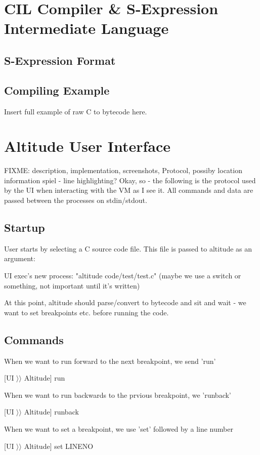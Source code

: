 \documentclass[10pt,a4paper]{report}
\begin{document}
\section{CIL Compiler \& S-Expression Intermediate Language}
\subsection{S-Expression Format}

\subsection{Compiling Example}
Insert full example of raw C to bytecode here.
\section{Altitude User Interface}
FIXME: description, implementation, screenshots, Protocol, possiby location information spiel - line highlighting?
Okay, so - the following is the protocol used by the UI when interacting with the VM as I see it. All commands and data are passed between the processes on stdin/stdout.
\subsection{Startup}
User starts by selecting a C source code file. This file is passed to altitude as an argument:

UI exec's new process: "altitude code/test/test.c" (maybe we use a switch or something, not important until it's written)

At this point, altitude should parse/convert to bytecode and sit and wait - we want to set breakpoints etc. before running the code.

\subsection{Commands}

When we want to run forward to the next breakpoint, we send 'run'

[UI $\rangle\rangle$ Altitude] run

When we want to run backwards to the prvious breakpoint, we 'runback'

[UI $\rangle\rangle$ Altitude] runback

When we want to set a breakpoint, we use 'set' followed by a line number

[UI $\rangle\rangle$ Altitude] set LINENO
\end{document}
